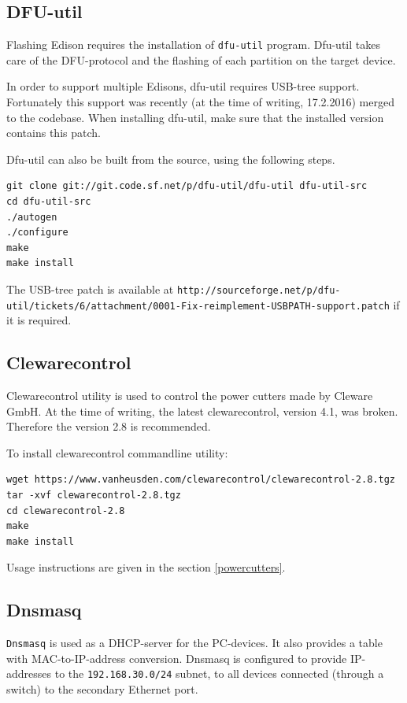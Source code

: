 \documentclass[a4paper,11pt]{article}
\newcommand{\cmd}[1]{\texttt{#1}}
\begin{document}
\subsection*{DFU-util}
\label{dfuutil}

Flashing Edison requires the installation of \cmd{dfu-util} program. Dfu-util takes care of the DFU-protocol and the flashing of each partition on the target device.

In order to support multiple Edisons, dfu-util requires USB-tree support. Fortunately this support was recently (at the time of writing, 17.2.2016) merged to the codebase. When installing dfu-util, make sure that the installed version contains this patch. 

Dfu-util can also be built from the source, using the following steps.

\begin{lstlisting}
git clone git://git.code.sf.net/p/dfu-util/dfu-util dfu-util-src
cd dfu-util-src
./autogen
./configure
make
make install
\end{lstlisting}

The USB-tree patch is available at \cmd{http://sourceforge.net/p/dfu-util/tickets/6/attachment/0001-Fix-reimplement-USBPATH-support.patch} if it is required.

\subsection*{Clewarecontrol}
Clewarecontrol utility is used to control the power cutters made by Cleware GmbH. At the time of writing, the latest clewarecontrol, version 4.1, was broken. Therefore the version 2.8 is recommended.

To install clewarecontrol commandline utility:
\begin{lstlisting}
wget https://www.vanheusden.com/clewarecontrol/clewarecontrol-2.8.tgz
tar -xvf clewarecontrol-2.8.tgz
cd clewarecontrol-2.8
make
make install
\end{lstlisting}

Usage instructions are given in the section \ref{powercutters}.

\subsection*{Dnsmasq}
\cmd{Dnsmasq} is used as a DHCP-server for the PC-devices. It also provides a table with MAC-to-IP-address conversion. Dnsmasq is configured to provide IP-addresses to the \cmd{192.168.30.0/24} subnet, to all devices connected (through a switch) to the secondary Ethernet port.
\end{document}
